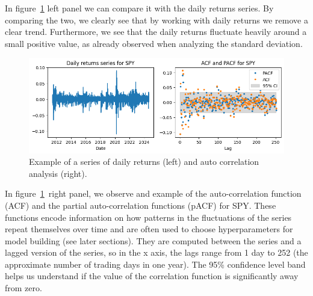 \documentclass[10pt]{article}
\begin{document}
In figure~{\ref{258382}} left panel we can compare it
with the daily returns series. By comparing the two, we clearly see that
by working with daily returns we remove a clear trend. Furthermore, we
see that the daily returns fluctuate heavily around a small positive
value, as already observed when analyzing the standard deviation.
\begin{figure}[H]
\begin{center}
\includegraphics[width=0.98\columnwidth]{figures/output6/output6}
\caption{{Example of a series of daily returns (left) and auto correlation
analysis (right).
{\label{258382}}%
}}
\end{center}
\end{figure}

In figure~{\ref{258382}}~right panel, we observe and
example of the auto-correlation function~ (ACF) and the partial
auto-correlation functions (pACF) for SPY. These functions encode
information on how patterns in the fluctuations of the series~ repeat
themselves over time and are often used to choose hyperparameters for
model building (see later sections). They are computed between the
series and a lagged version of the series, so in the x axis, the lags
range from 1 day to 252 (the approximate number of trading days in one
year). The 95\% confidence level band helps us understand if the value
of the correlation function is significantly away from zero.~
\end{document}
